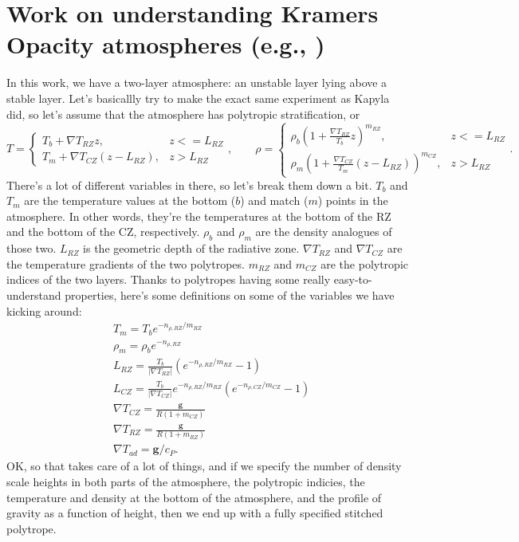 \documentclass[aps, pre, onecolumn, nofootinbib, notitlepage, groupedaddress, amsfonts, amssymb, amsmath, longbibliography]{revtex4-1}
\newcommand{\grad}{\ensuremath{\nabla}}
\begin{document}
\section{Work on understanding Kramers Opacity atmospheres (e.g., \cite{kapyla&all2017})}
In this work, we have a two-layer atmosphere: an unstable layer lying above a
stable layer. Let's basicallly try to make the exact same experiment as Kapyla did,
so let's assume that the atmosphere has polytropic stratification, or
\begin{equation}
T = \begin{cases}
T_b + \grad T_{RZ}z,&  z <= L_{RZ} \\
T_m + \grad T_{CZ}(z - L_{RZ}),& z > L_{RZ}
\end{cases}
,\qquad
\rho = \begin{cases}
\rho_b \left(1 + \frac{\grad T_{RZ}}{T_b}z\right)^{m_{RZ}},& z <= L_{RZ} \\
\rho_m \left(1 + \frac{\grad T_{CZ}}{T_m}(z - L_{RZ})\right)^{m_{CZ}},& z > L_{RZ}
\end{cases}.
\end{equation}
There's a lot of different variables in there, so let's break them down a bit.
$T_b$ and $T_m$ are the temperature values at the bottom ($b$) and match ($m$)
points in the atmosphere. In other words, they're the temperatures at the bottom
of the RZ and the bottom of the CZ, respectively. $\rho_b$ and $\rho_m$ are the
density analogues of those two. $L_{RZ}$ is the geometric depth of the radiative
zone. $\grad T_{RZ}$ and $\grad T_{CZ}$ are the temperature gradients of the two
polytropes. $m_{RZ}$ and $m_{CZ}$ are the polytropic indices of the two layers.
Thanks to polytropes having some really easy-to-understand properties, here's
some definitions on some of the variables we have kicking around:
\begin{equation}
\begin{split}
&T_m = T_b e^{-n_{\rho, RZ} / m_{RZ}} \\
&\rho_m = \rho_b e^{-n_{\rho, RZ}} \\
&L_{RZ} = \frac{T_b}{|\grad T_{RZ}|}\left(e^{-n_{\rho, RZ} / m_{RZ}} - 1\right) \\
&L_{CZ} = \frac{T_b}{|\grad T_{CZ}|}e^{-n_{\rho, RZ} / m_{RZ}}\left(e^{-n_{\rho, CZ} / m_{CZ}} - 1\right) \\
&\grad T_{CZ} = \frac{\bm{g}}{R(1 + m_{CZ})} \\
&\grad T_{RZ} = \frac{\bm{g}}{R(1 + m_{RZ})} \\
&\grad T_{ad} = \bm{g}/c_P.
\end{split}
\end{equation}
OK, so that takes care of a lot of things, and if we specify the number of density
scale heights in both parts of the atmosphere, the polytropic indicies, the
temperature and density at the bottom of the atmosphere, and the profile of
gravity as a function of height, then we end up with a fully specified stitched
polytrope.
\end{document}
